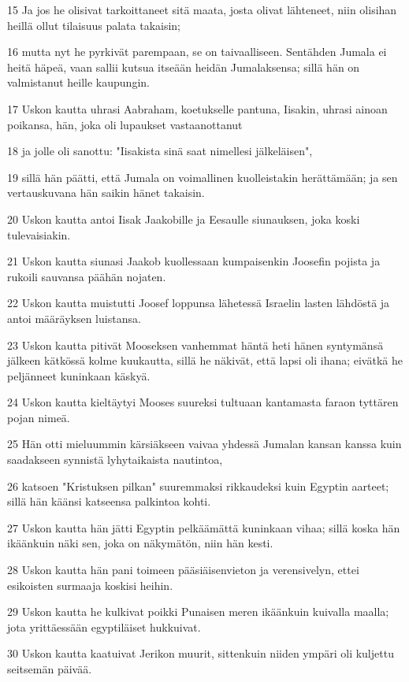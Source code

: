 \par 15 Ja jos he olisivat tarkoittaneet sitä maata, josta olivat lähteneet, niin olisihan heillä ollut tilaisuus palata takaisin;
\par 16 mutta nyt he pyrkivät parempaan, se on taivaalliseen. Sentähden Jumala ei heitä häpeä, vaan sallii kutsua itseään heidän Jumalaksensa; sillä hän on valmistanut heille kaupungin.
\par 17 Uskon kautta uhrasi Aabraham, koetukselle pantuna, Iisakin, uhrasi ainoan poikansa, hän, joka oli lupaukset vastaanottanut
\par 18 ja jolle oli sanottu: "Iisakista sinä saat nimellesi jälkeläisen",
\par 19 sillä hän päätti, että Jumala on voimallinen kuolleistakin herättämään; ja sen vertauskuvana hän saikin hänet takaisin.
\par 20 Uskon kautta antoi Iisak Jaakobille ja Eesaulle siunauksen, joka koski tulevaisiakin.
\par 21 Uskon kautta siunasi Jaakob kuollessaan kumpaisenkin Joosefin pojista ja rukoili sauvansa päähän nojaten.
\par 22 Uskon kautta muistutti Joosef loppunsa lähetessä Israelin lasten lähdöstä ja antoi määräyksen luistansa.
\par 23 Uskon kautta pitivät Mooseksen vanhemmat häntä heti hänen syntymänsä jälkeen kätkössä kolme kuukautta, sillä he näkivät, että lapsi oli ihana; eivätkä he peljänneet kuninkaan käskyä.
\par 24 Uskon kautta kieltäytyi Mooses suureksi tultuaan kantamasta faraon tyttären pojan nimeä.
\par 25 Hän otti mieluummin kärsiäkseen vaivaa yhdessä Jumalan kansan kanssa kuin saadakseen synnistä lyhytaikaista nautintoa,
\par 26 katsoen "Kristuksen pilkan" suuremmaksi rikkaudeksi kuin Egyptin aarteet; sillä hän käänsi katseensa palkintoa kohti.
\par 27 Uskon kautta hän jätti Egyptin pelkäämättä kuninkaan vihaa; sillä koska hän ikäänkuin näki sen, joka on näkymätön, niin hän kesti.
\par 28 Uskon kautta hän pani toimeen pääsiäisenvieton ja verensivelyn, ettei esikoisten surmaaja koskisi heihin.
\par 29 Uskon kautta he kulkivat poikki Punaisen meren ikäänkuin kuivalla maalla; jota yrittäessään egyptiläiset hukkuivat.
\par 30 Uskon kautta kaatuivat Jerikon muurit, sittenkuin niiden ympäri oli kuljettu seitsemän päivää.
